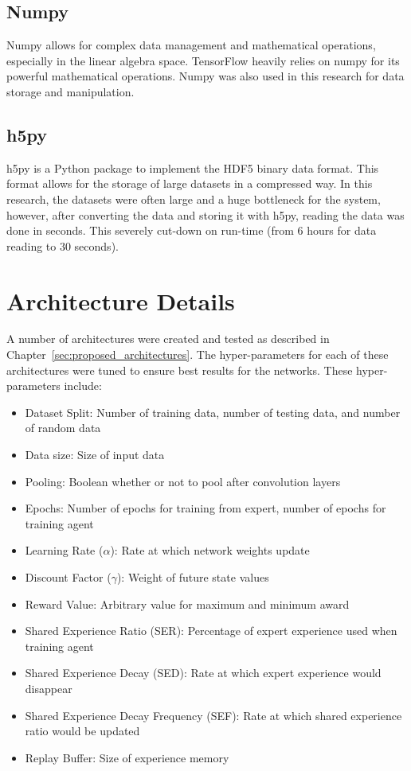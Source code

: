 \documentclass[12pt,american]{report}
\begin{document}
\subsection{Numpy}
Numpy allows for complex data management and mathematical operations, especially in the linear algebra space.  TensorFlow heavily relies on numpy for its powerful mathematical operations.  Numpy was also used in this research for data storage and manipulation. 
\subsection{h5py}
h5py is a Python package to implement the HDF5 binary data format.  This format allows for the storage of large datasets in a compressed way.  In this research, the datasets were often large and a huge bottleneck for the system, however, after converting the data and storing it with h5py, reading the data was done in seconds.  This severely cut-down on run-time (from 6 hours for data reading to 30 seconds). 

\section{Architecture Details}
A number of architectures were created and tested as described in Chapter~\ref{sec:proposed_architectures}.  The hyper-parameters for each of these architectures were tuned to ensure best results for the networks.  These hyper-parameters include:
\begin{itemize}
  \item Dataset Split: Number of training data, number of testing data, and number of random data
  \item Data size: Size of input data
  \item Pooling: Boolean whether or not to pool after convolution layers
  \item Epochs: Number of epochs for training from expert, number of epochs for training agent
  \item Learning Rate ($\alpha$): Rate at which network weights update
  \item Discount Factor ($\gamma$): Weight of future state values
  \item Reward Value: Arbitrary value for maximum and minimum award
  \item Shared Experience Ratio (SER): Percentage of expert experience used when training agent
  \item Shared Experience Decay (SED): Rate at which expert experience would disappear
  \item Shared Experience Decay Frequency (SEF): Rate at which shared experience ratio would be updated
  \item Replay Buffer: Size of experience memory
\end{itemize}
\end{document}
